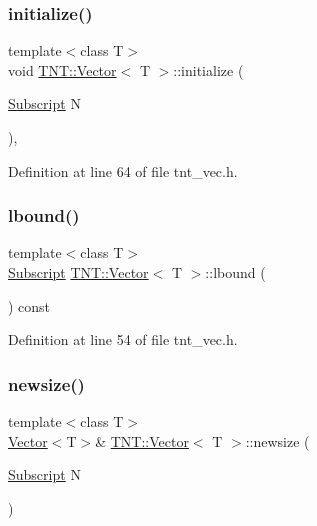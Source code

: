 \subsubsection{\texorpdfstring{initialize()}{initialize()}}
{\footnotesize\ttfamily template$<$class T$>$ \\
void \hyperlink{classTNT_1_1Vector}{T\+N\+T\+::\+Vector}$<$ T $>$\+::initialize (\begin{DoxyParamCaption}\item[{\hyperlink{namespaceTNT_af22e3f1460e145c04ce4e7d701e4c1c1}{Subscript}}]{N }\end{DoxyParamCaption})\hspace{0.3cm}{\ttfamily [inline]}, {\ttfamily [protected]}}



Definition at line 64 of file tnt\+\_\+vec.\+h.

\mbox{\label{classTNT_1_1Vector_a9483848bb84407f8f68ffe2fe1b72770}} 
\subsubsection{\texorpdfstring{lbound()}{lbound()}}
{\footnotesize\ttfamily template$<$class T$>$ \\
\hyperlink{namespaceTNT_af22e3f1460e145c04ce4e7d701e4c1c1}{Subscript} \hyperlink{classTNT_1_1Vector}{T\+N\+T\+::\+Vector}$<$ T $>$\+::lbound (\begin{DoxyParamCaption}{ }\end{DoxyParamCaption}) const\hspace{0.3cm}{\ttfamily [inline]}}



Definition at line 54 of file tnt\+\_\+vec.\+h.

\mbox{\label{classTNT_1_1Vector_a6c02daa35702d244ca08c079ba490864}} 
\subsubsection{\texorpdfstring{newsize()}{newsize()}}
{\footnotesize\ttfamily template$<$class T$>$ \\
\hyperlink{classTNT_1_1Vector}{Vector}$<$T$>$\& \hyperlink{classTNT_1_1Vector}{T\+N\+T\+::\+Vector}$<$ T $>$\+::newsize (\begin{DoxyParamCaption}\item[{\hyperlink{namespaceTNT_af22e3f1460e145c04ce4e7d701e4c1c1}{Subscript}}]{N }\end{DoxyParamCaption})\hspace{0.3cm}{\ttfamily [inline]}}



